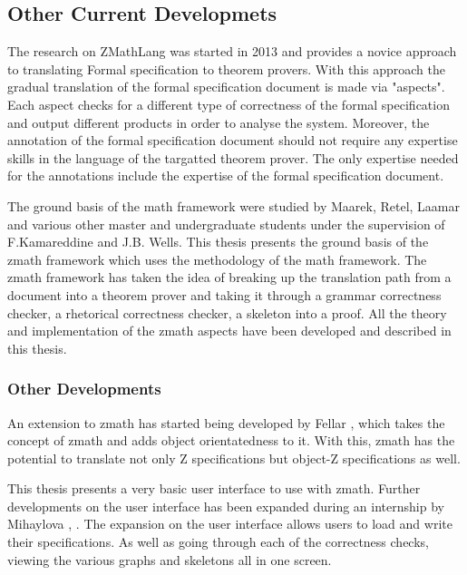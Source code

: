 \subsection{Other Current Developmets}
\label{subsec:currendevelopments}

The research on ZMathLang was started in 2013 and provides a novice approach to translating Formal specification to theorem provers. With this approach the gradual translation of the formal specification document is made via "aspects". Each aspect checks for a different type of correctness of the formal specification and output different products in order to analyse the system. Moreover, the annotation of the formal specification document should not require any expertise skills in the language of the targatted theorem prover. The only expertise needed for the annotations include the expertise of the formal specification document.

The ground basis of the \gls{math} framework were studied by Maarek, Retel, Laamar and various other master and undergraduate students under the supervision of F.Kamareddine and J.B. Wells. This thesis presents the ground basis of the \gls{zmath} framework which uses the methodology of the \gls{math} framework. The \gls{zmath} framework has taken the idea of breaking up the translation path from a document into a theorem prover and taking it through a grammar correctness checker, a rhetorical correctness checker, a skeleton into a proof. All the theory and implementation of the \gls{zmath} aspects have been developed and described in this thesis.

\subsubsection{Other Developments}

An extension to \gls{zmath} has started being developed by Fellar \cite{zmathmaster}, \cite{ozmathconference} which takes the concept of \gls{zmath} and adds object orientatedness to it. With this, \gls{zmath} has the potential to translate not only Z specifications but object-Z specifications as well. 

This thesis presents a very basic user interface to use with \gls{zmath}. Further developments on the user interface has been expanded during an internship by Mihaylova \cite{zmathuser}, \cite{zmathinternship}. The expansion on the user interface allows users to load and write their specifications. As well as going through each of the correctness checks, viewing the various graphs and skeletons all in one screen.

